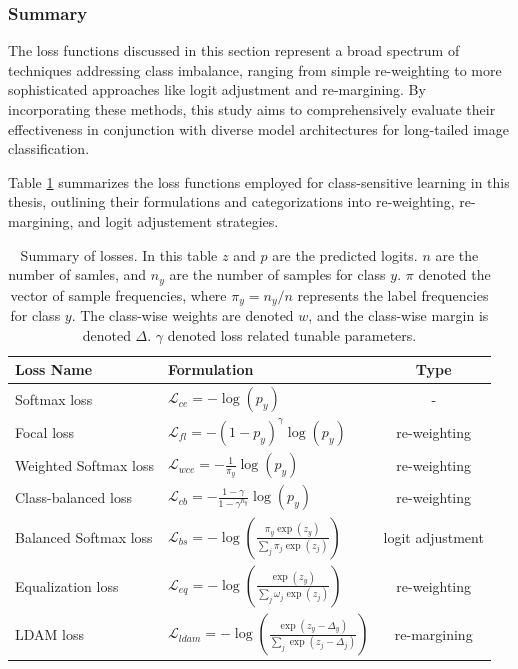 \subsubsection{Summary}
The loss functions discussed in this section represent a broad spectrum of techniques addressing class imbalance, ranging from simple re-weighting to more sophisticated approaches like logit adjustment and re-margining. By incorporating these methods, this study aims to comprehensively evaluate their effectiveness in conjunction with diverse model architectures for long-tailed image classification.

Table \ref{tab:loss_summary} summarizes the loss functions employed for class-sensitive learning in this thesis, outlining their formulations and categorizations into re-weighting, re-margining, and logit adjustement strategies.


\begin{table}[H]
    \centering
    \caption{Summary of losses. In this table $z$ and $p$ are the predicted logits. $n$ are the number of samles, and $n_y$ are the number of samples for class $y$. $\pi$ denoted the vector of sample frequencies, where $\pi_y=n_y/n$ represents the label frequencies for class $y$. The class-wise weights are denoted $w$, and the class-wise margin is denoted $\Delta$. $\gamma$ denoted loss related tunable parameters.}
    \small
    \label{tab:loss_summary}
    \begin{tabular}{|l|l|c|}
    \hline
    \textbf{Loss Name}       & \textbf{Formulation}                                                & \textbf{Type}        \\ \hline
    Softmax loss \cite{pytorch_crossentropy}             & $\mathcal{L}_{ce} = - \log(p_y)$                                              & -                   \\
    Focal loss \cite{lin2018focallossdenseobject}     & $\mathcal{L}_{fl} = -(1 - p_y)^\gamma \log(p_y)$                             & re-weighting        \\
    Weighted Softmax loss \cite{zhang2023deep}    & $\mathcal{L}_{wce} = - \frac{1}{\pi_y} \log(p_y)$                           & re-weighting        \\
    Class-balanced loss \cite{cui2019classbalancedlossbasedeffective} & $\mathcal{L}_{cb} = - \frac{1 - \gamma}{1 - \gamma^{n_y}} \log(p_y)$         & re-weighting        \\
    Balanced Softmax loss \cite{ren2020balancedmetasoftmaxlongtailedvisual} & $\mathcal{L}_{bs} = - \log\left( \frac{\pi_y \exp(z_y)}{\sum_j \pi_j \exp(z_j)} \right)$ & logit adjustment        \\
    Equalization loss \cite{tan2020equalizationlosslongtailedobject} & $\mathcal{L}_{eq} = - \log\left( \frac{\exp(z_y)}{\sum_j \omega_j \exp(z_j)} \right)$    & re-weighting        \\
    LDAM loss \cite{cao2019learningimbalanceddatasetslabeldistributionaware}      & $\mathcal{L}_{ldam} = - \log\left( \frac{\exp(z_y - \Delta_y)}{\sum_j \exp(z_j - \Delta_j)} \right)$ & re-margining        \\
    \hline
    \end{tabular}
\end{table}

